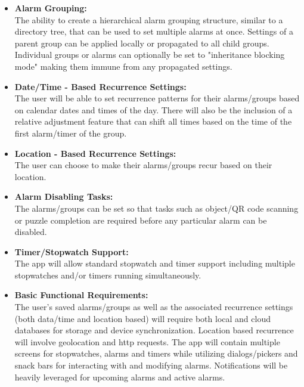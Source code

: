 \documentclass{article}
\begin{document}
\begin{itemize}
    
    \item \textbf{Alarm Grouping:}\\The ability to create a hierarchical alarm grouping structure, similar to a directory tree,
    that can be used to set multiple alarms at once. Settings of a parent group can be applied locally or propagated to all child groups.
    Individual groups or alarms can optionally be set to "inheritance blocking mode" making them immune from any propagated settings.

    \item \textbf{Date/Time - Based Recurrence Settings:}\\The user will be able to set recurrence patterns for their alarms/groups based on
    calendar dates and times of the day. There will also be the inclusion of a relative adjustment feature that can shift all times based on
    the time of the first alarm/timer of the group.

    \item \textbf{Location - Based Recurrence Settings:}\\The user can choose to make their alarms/groups recur based on their location.
    
    \item \textbf{Alarm Disabling Tasks:}\\The alarms/groups can be set so that tasks such as object/QR code scanning or puzzle completion
    are required before any particular alarm can be disabled.

    \item \textbf{Timer/Stopwatch Support:}\\The app will allow standard stopwatch and timer support including multiple stopwatches and/or
    timers running simultaneously.

    \item \textbf{Basic Functional Requirements:}\\The user's saved alarms/groups as well as the associated recurrence settings (both data/time and location based)
    will require both local and cloud databases for storage and device synchronization. Location based recurrence will involve geolocation and http requests.
    The app will contain multiple screens for stopwatches, alarms and timers while utilizing dialogs/pickers and snack bars for interacting with and modifying alarms.
    Notifications will be heavily leveraged for upcoming alarms and active alarms.

\end{itemize}
\end{document}
